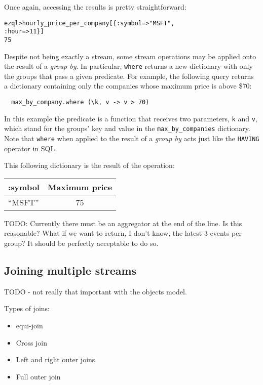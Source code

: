 \documentclass{report}
\newenvironment{evaluation}
{
  \framed
  \begin{alltt}
}
{
  \end{alltt}
  \endframed
}
\begin{document}
Once again, accessing the results is pretty straightforward:

\begin{evaluation}
  ezql> hourly_price_per_company[\{ :symbol => "MSFT",
                                    :hour   => 11 \}]
  75
\end{evaluation}

Despite not being exactly a stream, some stream operations may be
applied onto the result of a \emph{group by}. In particular,
\verb=where= returns a new dictionary with only the groups that pass a
given predicate. For example, the following query returns a dictionary
containing only the companies whose maximum price is above \$70:

\begin{verbatim}
  max_by_company.where (\k, v -> v > 70)
\end{verbatim}

In this example the predicate is a function that receives two
parameters, \verb=k= and \verb=v=, which stand for the groups' key and
value in the \verb=max_by_companies= dictionary. Note that
\verb=where= when applied to the result of a \emph{group by} acts just
like the \verb=HAVING= operator in SQL.

This following dictionary is the result of the operation:

\begin{tabular}{ |l|c| }
  \hline
  :symbol & Maximum price \\
  \hline
  ``MSFT'' & 75 \\
  \hline
\end{tabular}


TODO: Currently there must be an aggregator at the end of the line. Is
this reasonable? What if we want to return, I don't know, the latest 3
events per group? It should be perfectly acceptable to do so.

\subsection{Joining multiple streams}
\label{sec:join}

TODO - not really that important with the objects model.

Types of joins:
\begin{itemize}
\item equi-join
\item Cross join
\item Left and right outer joins
\item Full outer join
\end{itemize}
\end{document}
